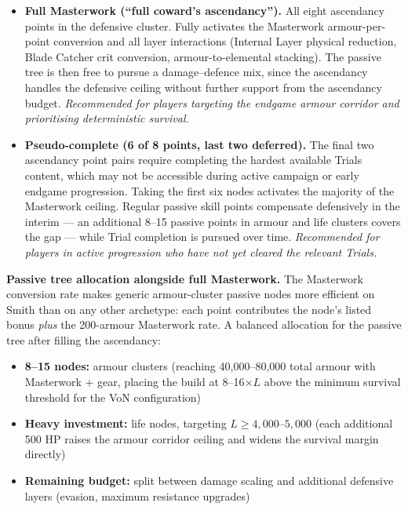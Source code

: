 \documentclass[12pt, letterpaper]{article}
\begin{document}
\begin{itemize}
    \item \textbf{Full Masterwork (``full coward's ascendancy'').} All eight ascendancy points in the defensive cluster. Fully activates the Masterwork armour-per-point conversion and all layer interactions (Internal Layer physical reduction, Blade Catcher crit conversion, armour-to-elemental stacking). The passive tree is then free to pursue a damage--defence mix, since the ascendancy handles the defensive ceiling without further support from the ascendancy budget. \textit{Recommended for players targeting the endgame armour corridor and prioritising deterministic survival.}

    \item \textbf{Pseudo-complete (6 of 8 points, last two deferred).} The final two ascendancy point pairs require completing the hardest available Trials content, which may not be accessible during active campaign or early endgame progression. Taking the first six nodes activates the majority of the Masterwork ceiling. Regular passive skill points compensate defensively in the interim --- an additional 8--15 passive points in armour and life clusters covers the gap --- while Trial completion is pursued over time. \textit{Recommended for players in active progression who have not yet cleared the relevant Trials.}
\end{itemize}

\textbf{Passive tree allocation alongside full Masterwork.} The Masterwork conversion rate makes generic armour-cluster passive nodes more efficient on Smith than on any other archetype: each point contributes the node's listed bonus \textit{plus} the 200-armour Masterwork rate. A balanced allocation for the passive tree after filling the ascendancy:

\begin{itemize}
    \item \textbf{8--15 nodes:} armour clusters (reaching 40{,}000--80{,}000 total armour with Masterwork + gear, placing the build at 8--16$\times L$ above the minimum survival threshold for the VoN configuration)
    \item \textbf{Heavy investment:} life nodes, targeting $L \geq 4{,}000$--$5{,}000$ (each additional 500 HP raises the armour corridor ceiling and widens the survival margin directly)
    \item \textbf{Remaining budget:} split between damage scaling and additional defensive layers (evasion, maximum resistance upgrades)
\end{itemize}
\end{document}
